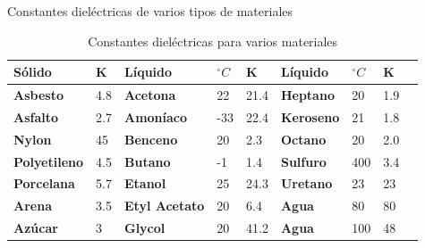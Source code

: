 \documentclass[aspectratio=169]{beamer}
\begin{document}
\begin{frame}{Constantes dieléctricas de varios tipos de materiales}
 \begin{table}[]
 \footnotesize
    \centering
    \begin{tabular}{m{1.8cm} m{0.8cm} m{1.8cm} m{0.8cm} m{0.8cm} m{1.8cm} m{0.8cm} m{0.8cm} m{1.6cm}}
        \toprule
        \textbf{Sólido}  & \textbf{K} &\textbf{Líquido} & \textbf{$^\circ C$} & \textbf{K} &\textbf{Líquido} & \textbf{$^\circ C$} & \textbf{K} \\
        \midrule
        \textbf{Asbesto} & 4.8 & \textbf{Acetona} & 22 & 21.4 &  \textbf{Heptano} & 20  & 1.9\\
        \textbf{Asfalto} & 2.7 & \textbf{Amoníaco} & -33 & 22.4 & \textbf{Keroseno} & 21 & 1.8\\
        \textbf{Nylon} & 45 & \textbf{Benceno} & 20 & 2.3 & \textbf{Octano} & 20 & 2.0\\
       \textbf{Polyetileno} & 4.5 &  \textbf{Butano} & -1 & 1.4 & \textbf{Sulfuro} & 400 & 3.4\\
        \textbf{Porcelana} & 5.7 & \textbf{Etanol} & 25 & 24.3 & \textbf{Uretano} & 23 & 23\\
        \textbf{Arena} & 3.5 & \textbf{Etyl Acetato} & 20 & 6.4 & \textbf{Agua} & 80 & 80\\
        \textbf{Azúcar} & 3 & \textbf{Glycol} & 20 & 41.2 & \textbf{Agua} & 100 & 48\\
        \bottomrule
    \end{tabular}
    \caption{Constantes dieléctricas para varios materiales \cite{sole2005instrumentacion}}
    \label{tab:Comparacion}
\end{table}
\end{frame}
\end{document}
